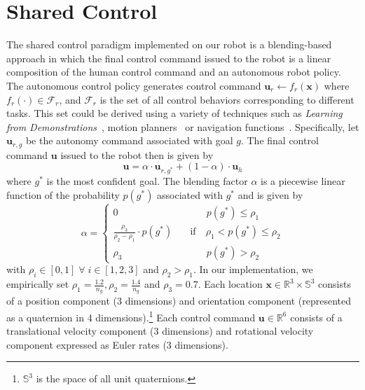 \documentclass[natbib, twocolumn]{svjour3}          %
\begin{document}
\section{Shared Control}\label{sec:shared-control}
The shared control paradigm implemented on our robot is a blending-based approach in  which the final control command issued to the robot is a linear composition of the human control command and an autonomous robot policy.
The autonomous control policy generates control command
$\boldsymbol{u}_r \leftarrow f_{r}(\boldsymbol{x})$
where $f_{r}(\cdot) \in \mathcal{F}_{r}$, and $\mathcal{F}_{r}$ is the set of all control behaviors corresponding to different tasks. This set could be derived using a variety of techniques such as \textit{Learning from Demonstrations}~\citep{argall2009survey, schaal1997learning}, motion planners~\citep{hsu2002randomized,ratliff2009chomp} or navigation functions~\citep{rimon1992exact,tanner2003nonholonomic}. Specifically, let $\boldsymbol{u}_{r,g}$ be the autonomy command associated with goal $g$. The final control command $\boldsymbol{u}$ issued to the robot then is given by
\begin{equation*}
\boldsymbol{u} = \alpha\cdot \boldsymbol{u}_{r,g^*} + (1 - \alpha)\cdot \boldsymbol{u}_h
\end{equation*}
where $g^*$ is the most confident goal. The blending factor $\alpha$ is a piecewise linear function of the probability $p(g^*)$ associated with $g^*$ and is given by
$$
\alpha = \left\{
\begin{array}{ll}
0 & \quad\quad~~~ p(g^*) \leq \rho_1 \\
\frac{\rho_3}{\rho_2 - \rho_1}\cdot p(g^*) &  \quad \text{if}\quad \rho_1 < p(g^*) \leq \rho_2  \\
\rho_3 & \quad\quad~~~ p(g^*) > \rho_2 	
\end{array}
\right.
$$
with $\rho_i \in [0, 1] \;\forall\; i \in [1,2,3]$ and $ \rho_2 > \rho_1$. 
In our implementation, we empirically set $\rho_1 = \frac{1.2}{n_g}, \rho_2 = \frac{1.4}{n_g}$ and $ \rho_3 = 0.7$. Each location $\boldsymbol{x} \in \mathbb{R}^3 \times \mathbb{S}^3$ consists of a position component (3 dimensions) and orientation component (represented as a quaternion in 4 dimensions).\footnote{$\mathbb{S}^3$ is the space of all unit quaternions.} Each control command $\boldsymbol{u} \in \mathbb{R}^6$ consists of a translational velocity component (3 dimensions) and rotational velocity component expressed as Euler rates (3 dimensions).
\end{document}

